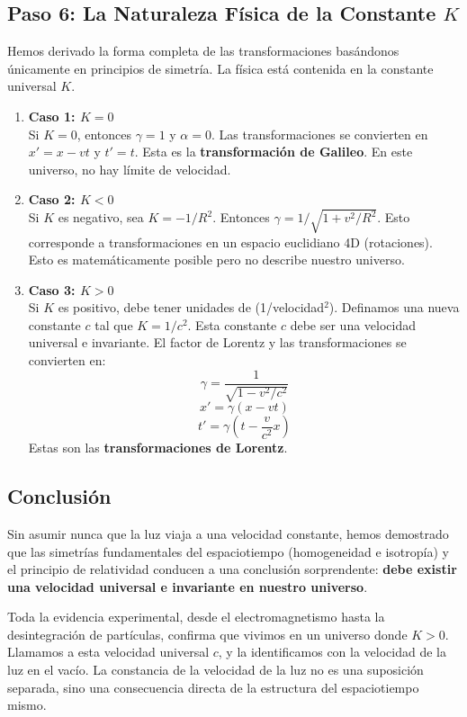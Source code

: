 \documentclass[11pt,a4paper]{article}
\begin{document}
\subsection{Paso 6: La Naturaleza Física de la Constante \texorpdfstring{$K$}{K}}
Hemos derivado la forma completa de las transformaciones basándonos únicamente en principios de simetría. La física está contenida en la constante universal $K$.
\begin{enumerate}
    \item \textbf{Caso 1: $K=0$} \\
    Si $K=0$, entonces $\gamma = 1$ y $\alpha=0$. Las transformaciones se convierten en $x' = x - vt$ y $t'=t$. Esta es la \textbf{transformación de Galileo}. En este universo, no hay límite de velocidad.

    \item \textbf{Caso 2: $K<0$} \\
    Si $K$ es negativo, sea $K = -1/R^2$. Entonces $\gamma = 1/\sqrt{1+v^2/R^2}$. Esto corresponde a transformaciones en un espacio euclidiano 4D (rotaciones). Esto es matemáticamente posible pero no describe nuestro universo.

    \item \textbf{Caso 3: $K>0$} \\
    Si $K$ es positivo, debe tener unidades de (1/velocidad$^2$). Definamos una nueva constante $c$ tal que $K = 1/c^2$. Esta constante $c$ debe ser una velocidad universal e invariante. El factor de Lorentz y las transformaciones se convierten en:
    \[ \gamma = \frac{1}{\sqrt{1 - v^2/c^2}} \]
    \[ x' = \gamma(x-vt) \]
    \[ t' = \gamma(t - \frac{v}{c^2}x) \]
    Estas son las \textbf{transformaciones de Lorentz}.
\end{enumerate}

\subsection{Conclusión}
Sin asumir nunca que la luz viaja a una velocidad constante, hemos demostrado que las simetrías fundamentales del espaciotiempo (homogeneidad e isotropía) y el principio de relatividad conducen a una conclusión sorprendente: \textbf{debe existir una velocidad universal e invariante en nuestro universo}.

Toda la evidencia experimental, desde el electromagnetismo hasta la desintegración de partículas, confirma que vivimos en un universo donde $K > 0$. Llamamos a esta velocidad universal $c$, y la identificamos con la velocidad de la luz en el vacío. La constancia de la velocidad de la luz no es una suposición separada, sino una consecuencia directa de la estructura del espaciotiempo mismo.
\end{document}

